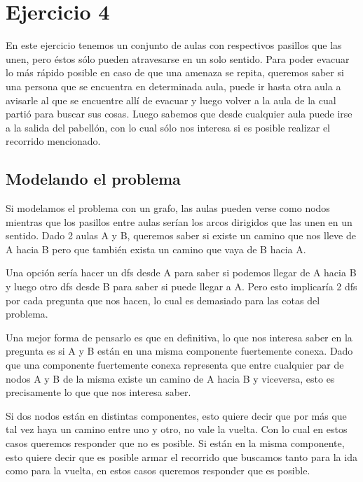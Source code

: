 \section{Ejercicio 4}

En este ejercicio tenemos un conjunto de aulas con respectivos pasillos que las unen, pero éstos sólo pueden atravesarse en un solo sentido. Para poder evacuar lo más rápido posible en caso de que una amenaza se repita, queremos saber si una persona que se encuentra en determinada aula, puede ir hasta otra aula a avisarle al que se encuentre allí de evacuar y luego volver a la aula de la cual partió para buscar sus cosas. Luego sabemos que desde cualquier aula puede irse a la salida del pabellón, con lo cual sólo nos interesa si es posible realizar el recorrido mencionado. 


\subsection{Modelando el problema}

Si modelamos el problema con un grafo, las aulas pueden verse como nodos mientras que los pasillos entre aulas serían los arcos dirigidos que las unen en un sentido. Dado 2 aulas A y B, queremos saber si existe un camino que nos lleve de A hacia B pero que también exista un camino que vaya de B hacia A. \newline

Una opción sería hacer un dfs desde A para saber si podemos llegar de A hacia B y luego otro dfs desde B para saber si puede llegar a A. Pero esto implicaría 2 dfs por cada pregunta que nos hacen, lo cual es demasiado para las cotas del problema. \newline

Una mejor forma de pensarlo es que en definitiva, lo que nos interesa saber en la pregunta es si A y B están en una misma componente fuertemente conexa. Dado que una componente fuertemente conexa representa que entre cualquier par de nodos A y B de la misma existe un camino de A hacia B y viceversa, esto es precisamente lo que que nos interesa saber.  \newline

Si dos nodos están en distintas componentes, esto quiere decir que por más que tal vez haya un camino entre uno y otro, no vale la vuelta. Con lo cual en estos casos queremos responder que no es posible. Si están en la misma componente, esto quiere decir que es posible armar el recorrido que buscamos tanto para la ida como para la vuelta, en estos casos queremos responder que es posible.\newline

